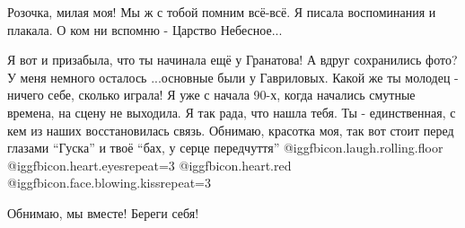 \begin{itemize}
\begin{itemize} %

Розочка, милая моя! Мы ж с тобой помним всё-всё. Я писала воспоминания и
плакала. О ком ни вспомню - Царство Небесное...

Я вот и призабыла, что ты начинала ещё у Гранатова! А вдруг сохранились фото? У
меня немного осталось ...основные были у Гавриловых. Какой же ты молодец -
ничего себе, сколько играла! Я уже с начала 90-х, когда начались смутные
времена, на сцену не выходила. Я так рада, что нашла тебя. Ты - единственная, с
кем из наших восстановилась связь. Обнимаю, красотка моя, так вот стоит перед
глазами \enquote{Гуска} и твоё \enquote{бах, у серце передчуття}
@igg{fbicon.laugh.rolling.floor}  @igg{fbicon.heart.eyes}{repeat=3}
@igg{fbicon.heart.red} @igg{fbicon.face.blowing.kiss}{repeat=3} 

Обнимаю, мы вместе! Береги себя!

\end{itemize} %

\end{itemize} %
